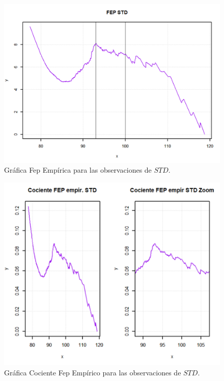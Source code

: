 \documentclass[10.5pt,notitlepage]{article}
\theoremstyle{plain}
\begin{document}
\begin{figure}[htb]
    \centering
    \includegraphics[scale = 0.4]{Incisob/FepSTD.png}
    \caption{Gráfica Fep Empírica para las observaciones de \(STD\). }
    \label{fig:8}
\end{figure}

\begin{figure}[htb]
    \centering
    \includegraphics[scale = 0.4]{Incisob/CocFepSTD.png}
    \caption{Gráfica Cociente Fep Empírico para las observaciones de \(STD\).}
    \label{fig:9}
\end{figure}
\end{document}
